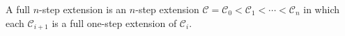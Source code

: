 A full $n$-step extension is an $n$-step extension $\mathcal{C} = \mathcal{C}_0 < \mathcal{C}_1 < \cdots < \mathcal{C}_n$ in which each $\mathcal{C}_{i+1}$ is a full one-step extension of $\mathcal{C}_i$.
